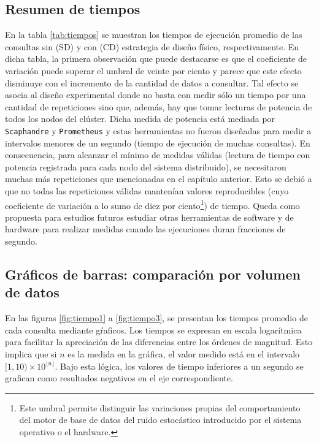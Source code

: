 \documentclass[12pt, letter paper]{report}
\begin{document}
      \subsection{Resumen de tiempos} %
      \label{sub:resumen_de_tiempos}
        En la tabla \ref{tab:tiempos} se muestran los tiempos de ejecución
        promedio de las consultas sin (SD) y con (CD) estrategia de diseño
        físico, respectivamente. En dicha tabla, la primera observación que
        puede destacarse es que el coeficiente de variación puede superar el
        umbral de veinte por ciento y parece que este efecto disminuye con el
        incremento de la cantidad de datos a consultar. Tal efecto se asocia al
        diseño experimental donde no basta con medir sólo un tiempo por una
        cantidad de repeticiones sino que, además, hay que tomar lecturas de
        potencia de todos los nodos del clúster. Dicha medida de potencia está
        mediada por \texttt{Scaphandre} y \texttt{Prometheus} y estas
        herramientas no fueron diseñadas para medir a intervalos menores de un
        segundo (tiempo de ejecución de muchas consultas). En consecuencia, para
        alcanzar el mínimo de medidas válidas (lectura de tiempo con potencia
        registrada para cada nodo del sistema distribuido), se necesitaron
        muchas más repeticiones que mencionadas en el capítulo anterior. Esto se
        debió a que no todas las repeticiones válidas mantenían valores
        reproducibles (cuyo coeficiente de variación a lo sumo de diez por
        ciento\footnote[1]{Este umbral permite distinguir las variaciones
        propias del comportamiento del motor de base de datos del ruido
        estocástico introducido por el sistema operativo o el hardware.}) de
        tiempo. Queda como propuesta para estudios futuros estudiar otras
        herramientas de software y de hardware para realizar medidas cuando las
        ejecuciones duran fracciones de segundo.

      \subsection{Gráficos de barras: comparación por volumen de datos} %
      \label{sub:gráficos_de_barras_comparación_por_volumen_de_datos}
        En las figuras \ref{fig:tiempo1} a \ref{fig:tiempo3}, se presentan los
        tiempos promedio de cada consulta mediante gŕaficos. Los tiempos se
        expresan en escala logarítmica para facilitar la apreciación de las
        diferencias entre los órdenes de magnitud. Esto implica que si $n$ es la
        medida en la gráfica, el valor medido está en el intervalo $[1,10)
        \times 10^{\lfloor n \rfloor}$. Bajo esta lógica, los valores de tiempo
        inferiores a un segundo se grafican como resultados negativos en el eje
        correspondiente.
\end{document}
